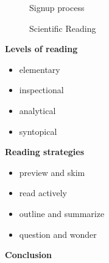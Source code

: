 \begin{frame}
\begin{figure}[htp]\centering
\caption{Signup process}
\end{figure}
\nocite{Adler.1972}
\end{frame}
\begin{frame}
\begin{figure}[htp]\centering
\caption{Scientific Reading}
\end{figure}
\nocite{Adler.1972}\nocite{Keshav2016}
\end{frame}
\begin{frame}

\begin{multicols}{2}
\textbf{Levels of reading}\vspace{0.5cm}
\begin{itemize}\setlength\itemsep{1em}
  \item elementary
  \item inspectional
  \item analytical
  \item syntopical
\end{itemize}

\columnbreak

\textbf{Reading strategies}\vspace{0.5cm}
\begin{itemize}\setlength\itemsep{1em}
\item preview and skim
\item read actively
\item outline and summarize
\item question and wonder
\end{itemize}
\end{multicols}

\end{frame}
\begin{frame}\begin{center}
\LARGE\textbf{Conclusion}
\end{center}\end{frame}

